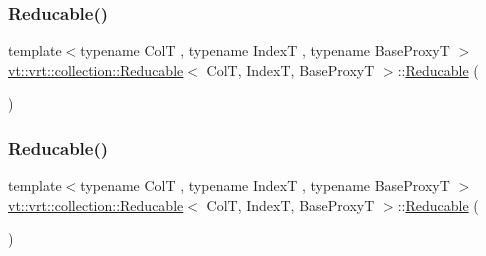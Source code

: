\subsubsection{\texorpdfstring{Reducable()}{Reducable()}\hspace{0.1cm}{\footnotesize\ttfamily [1/4]}}
{\footnotesize\ttfamily template$<$typename ColT , typename IndexT , typename Base\+ProxyT $>$ \\
\hyperlink{structvt_1_1vrt_1_1collection_1_1_reducable}{vt\+::vrt\+::collection\+::\+Reducable}$<$ ColT, IndexT, Base\+ProxyT $>$\+::\hyperlink{structvt_1_1vrt_1_1collection_1_1_reducable}{Reducable} (\begin{DoxyParamCaption}{ }\end{DoxyParamCaption})\hspace{0.3cm}{\ttfamily [default]}}

\mbox{\label{structvt_1_1vrt_1_1collection_1_1_reducable_aafc682961c7c961547d91358cda46792}} 
\subsubsection{\texorpdfstring{Reducable()}{Reducable()}\hspace{0.1cm}{\footnotesize\ttfamily [2/4]}}
{\footnotesize\ttfamily template$<$typename ColT , typename IndexT , typename Base\+ProxyT $>$ \\
\hyperlink{structvt_1_1vrt_1_1collection_1_1_reducable}{vt\+::vrt\+::collection\+::\+Reducable}$<$ ColT, IndexT, Base\+ProxyT $>$\+::\hyperlink{structvt_1_1vrt_1_1collection_1_1_reducable}{Reducable} (\begin{DoxyParamCaption}\item[{\hyperlink{structvt_1_1vrt_1_1collection_1_1_reducable}{Reducable}$<$ ColT, IndexT, Base\+ProxyT $>$ const \&}]{ }\end{DoxyParamCaption})\hspace{0.3cm}{\ttfamily [default]}}

\mbox{\label{structvt_1_1vrt_1_1collection_1_1_reducable_a4c5250ba5364ae0965c119773e87f4e8}} 
